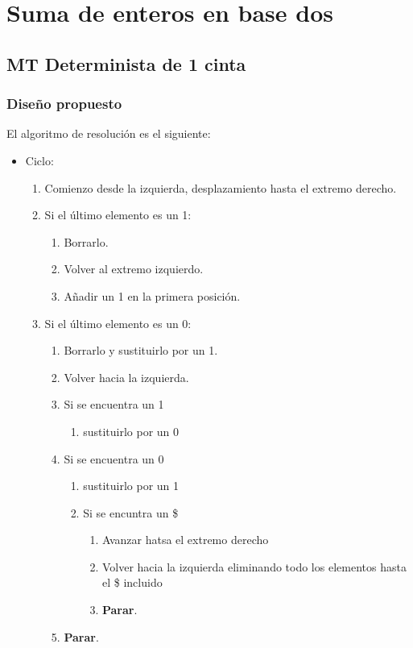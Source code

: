 \section{Suma de enteros en base dos}


\subsection{MT Determinista de 1 cinta}

\subsubsection*{Diseño propuesto}
El algoritmo de resolución es el siguiente:

\begin{itemize}
    \item Ciclo:
    \begin{enumerate}[1.]
        \item Comienzo desde la izquierda, desplazamiento hasta el extremo derecho.
        \item Si el último elemento es un 1:
        \begin{enumerate}[1.]
            \item Borrarlo.
            \item Volver al extremo izquierdo.
            \item Añadir un 1 en la primera posición.
        \end{enumerate}
        \item Si el último elemento es un 0:
        \begin{enumerate}[1.]
            \item Borrarlo y sustituirlo por un 1.
            \item Volver hacia la izquierda.
            \item Si se encuentra un 1 
            \begin{enumerate}[1.] 
                \item sustituirlo por un 0
            \end{enumerate}
            \item Si se encuentra un 0
            \begin{enumerate}[1.]
                \item sustituirlo por un 1
                \item Si se encuntra un \$
                \begin{enumerate}[1.]
                    \item Avanzar hatsa el extremo derecho
                    \item Volver hacia la izquierda eliminando todo los elementos hasta el \$ incluido
                    \item \textbf{Parar}.
                \end{enumerate}
            \end{enumerate}
            \item \textbf{Parar}.
        \end{enumerate}
    \end{enumerate}
\end{itemize}


